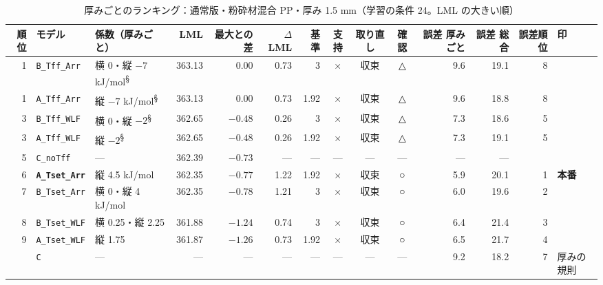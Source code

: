 \documentclass[paper=a4paper,landscape,fontsize=10pt,line_length=62zw,number_of_lines=34]{jlreq}
\let\origtextbf\textbf
\renewcommand{\textbf}[1]{\origtextbf{\gtfamily #1}}   %
\begin{document}
\begin{table}[H]\centering\footnotesize
\caption{厚みごとのランキング：通常版・粉砕材混合 PP・厚み 1.5 mm（学習の条件 24。LML の大きい順）}
\begin{tabular}{rlp{11\zw}rrrrccc rrrl}
\toprule
順位 & モデル & 係数（厚みごと） & LML & 最大との差 & $\Delta$LML & 基準 & 支持 & 取り直し & 確認 & 誤差 厚みごと & 誤差 総合 & 誤差順位 & 印 \\
\midrule
1 & \texttt{B\_\allowbreak{}Tff\_\allowbreak{}Arr} & 横 0・縦 $-7$ kJ/mol\textsuperscript{§} & 363.13 & 0.00 & 0.73 & 3 & × & 収束 & △ & 9.6 & 19.1 & 8 &  \\
1 & \texttt{A\_\allowbreak{}Tff\_\allowbreak{}Arr} & 縦 $-7$ kJ/mol\textsuperscript{§} & 363.13 & 0.00 & 0.73 & 1.92 & × & 収束 & △ & 9.6 & 18.8 & 8 &  \\
3 & \texttt{B\_\allowbreak{}Tff\_\allowbreak{}WLF} & 横 0・縦 $-2$\textsuperscript{§} & 362.65 & $-0.48$ & 0.26 & 3 & × & 収束 & △ & 7.3 & 18.6 & 5 &  \\
3 & \texttt{A\_\allowbreak{}Tff\_\allowbreak{}WLF} & 縦 $-2$\textsuperscript{§} & 362.65 & $-0.48$ & 0.26 & 1.92 & × & 収束 & △ & 7.3 & 19.1 & 5 &  \\
5 & \texttt{C\_\allowbreak{}noTff} & --- & 362.39 & $-0.73$ & --- & --- & --- & --- & --- & --- & --- &  &  \\
6 & \textbf{\texttt{A\_\allowbreak{}Tset\_\allowbreak{}Arr}} & 縦 4.5 kJ/mol & 362.35 & $-0.77$ & 1.22 & 1.92 & × & 収束 & ○ & 5.9 & 20.1 & 1 & \textbf{本番} \\
7 & \texttt{B\_\allowbreak{}Tset\_\allowbreak{}Arr} & 横 0・縦 4 kJ/mol & 362.35 & $-0.78$ & 1.21 & 3 & × & 収束 & ○ & 6.0 & 19.6 & 2 &  \\
8 & \texttt{B\_\allowbreak{}Tset\_\allowbreak{}WLF} & 横 0.25・縦 2.25 & 361.88 & $-1.24$ & 0.74 & 3 & × & 収束 & ○ & 6.4 & 21.4 & 3 &  \\
9 & \texttt{A\_\allowbreak{}Tset\_\allowbreak{}WLF} & 縦 1.75 & 361.87 & $-1.26$ & 0.73 & 1.92 & × & 収束 & ○ & 6.5 & 21.7 & 4 &  \\
 & \texttt{C} & --- & --- & --- & --- & --- & --- & --- & --- & 9.2 & 18.2 & 7 & 厚みの規則 \\
\bottomrule
\end{tabular}
\end{table}
\end{document}
